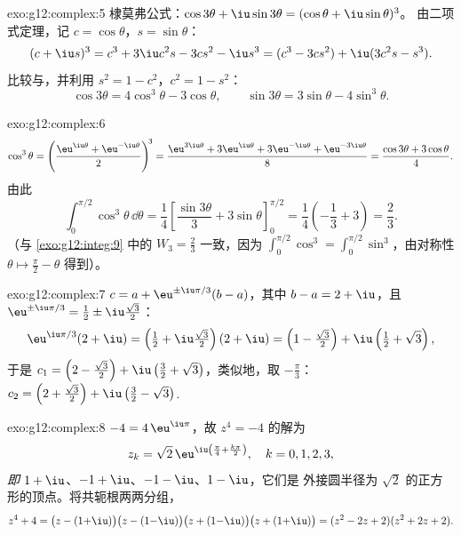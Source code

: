 \begin{solution}{exo:g12:complex:5}
棣莫弗公式：$\cos3\theta + \iu\sin3\theta = (\cos\theta + \iu\sin\theta)^3$。
由二项式定理，记 $c = \cos\theta$，$s = \sin\theta$：
\[
(c + \iu s)^3 = c^3 + 3\iu c^2 s - 3 c s^2 - \iu s^3
= (c^3 - 3cs^2) + \iu(3c^2 s - s^3).
\]
比较与，并利用 $s^2 = 1 - c^2$，$c^2 = 1 - s^2$：
\[
\cos3\theta = 4\cos^3\theta - 3\cos\theta,
\qquad
\sin3\theta = 3\sin\theta - 4\sin^3\theta .
\]
\end{solution}

\begin{solution}{exo:g12:complex:6}
\[
\cos^3\theta = \left(\frac{\eu^{\iu\theta} + \eu^{-\iu\theta}}{2}\right)^{\!3}
= \frac{\eu^{3\iu\theta} + 3\eu^{\iu\theta} + 3\eu^{-\iu\theta} + \eu^{-3\iu\theta}}{8}
= \frac{\cos3\theta + 3\cos\theta}{4}.
\]
由此
\[
\int_0^{\pi/2}\cos^3\theta\,\dd\theta
= \frac14\left[\frac{\sin3\theta}{3} + 3\sin\theta\right]_0^{\pi/2}
= \frac14\left(-\frac13 + 3\right) = \frac{2}{3}.
\]
（与 \cref{exo:g12:integ:9} 中的 $W_3 = \frac23$ 一致，因为
$\int_0^{\pi/2}\cos^3 = \int_0^{\pi/2}\sin^3$，由对称性
$\theta \mapsto \frac\pi2 - \theta$ 得到）。
\end{solution}

\begin{solution}{exo:g12:complex:7}
$c = a + \eu^{\pm\iu\pi/3}(b - a)$，其中 $b - a = 2 + \iu$，且
$\eu^{\pm\iu\pi/3} = \frac12 \pm \iu\frac{\sqrt3}{2}$：
\[
\eu^{\iu\pi/3}(2+\iu) = \left(\tfrac12 + \iu\tfrac{\sqrt3}{2}\right)(2+\iu)
= \left(1 - \tfrac{\sqrt3}{2}\right) + \iu\left(\tfrac12 + \sqrt3\right),
\]
于是 $c_1 = \left(2 - \frac{\sqrt3}{2}\right) +
\iu\left(\frac32 + \sqrt3\right)$，类似地，取
$-\frac\pi3$：
$c_2 = \left(2 + \frac{\sqrt3}{2}\right) + \iu\left(\frac32 - \sqrt3\right)$.
\end{solution}

\begin{solution}{exo:g12:complex:8}
$-4 = 4\,\eu^{\iu\pi}$，故 $z^4 = -4$ 的解为
\[
z_k = \sqrt2\,\eu^{\iu\left(\frac\pi4 + \frac{k\pi}{2}\right)},
\quad k = 0, 1, 2, 3,
\]
\emph{即} $1 + \iu$、$-1 + \iu$、$-1 - \iu$、$1 - \iu$，它们是
外接圆半径为 $\sqrt 2$ 的正方形的顶点。将共轭根两两分组，
\[
z^4 + 4 = \bigl(z - (1{+}\iu)\bigr)\bigl(z - (1{-}\iu)\bigr)
\bigl(z + (1{-}\iu)\bigr)\bigl(z + (1{+}\iu)\bigr)
= (z^2 - 2z + 2)(z^2 + 2z + 2).
\]
\end{solution}

